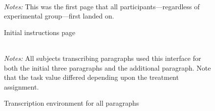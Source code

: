 \documentclass[11pt]{article}
\begin{document}
\begin{figure}[!h] 
  \caption{Initial instructions page\label{fig:instructions}}
\centering
\begin{minipage}{0.85\linewidth}
\\
\footnotesize 
\emph{Notes:} This was the first page that all participants---regardless of experimental group---first landed on. 
\end{minipage}
\end{figure}

\begin{figure}
  \caption{Transcription environment for all paragraphs \label{fig:environment}}
\centering
\begin{minipage}{0.85\linewidth}
\\
\footnotesize 
\emph{Notes:} All subjects transcribing paragraphs used this
interface for both the initial three paragraphs and the additional
paragraph. Note that the task value differed depending upon the
treatment assignment.
\end{minipage}
\end{figure}
\end{document}
